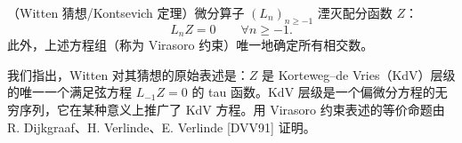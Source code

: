 \begin{theorem}[2.6]
（Witten 猜想/Kontsevich 定理）微分算子 $(L_n)_{n\ge-1}$ 湮灭配分函数 $Z$：
\begin{equation}
L_nZ=0\qquad \forall n\ge-1. \tag{2.69}
\end{equation}
此外，上述方程组（称为 Virasoro 约束）唯一地确定所有相交数。
\end{theorem}

我们指出，Witten 对其猜想的原始表述是：$Z$ 是 Korteweg--de Vries（KdV）层级的唯一一个满足弦方程 $L_{-1}Z=0$ 的 tau 函数。KdV 层级是一个偏微分方程的无穷序列，它在某种意义上推广了 KdV 方程。用 Virasoro 约束表述的等价命题由 R. Dijkgraaf、H. Verlinde、E. Verlinde [DVV91] 证明。


